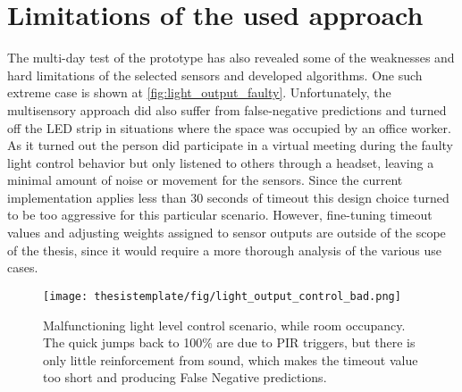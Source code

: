 
\section{Limitations of the used approach}

The multi-day test of the prototype has also revealed some of the weaknesses and hard limitations of the selected sensors and developed algorithms. One such extreme case is shown at \autoref{fig:light_output_faulty}. Unfortunately, the multisensory approach did also suffer from false-negative predictions and turned off the LED strip in situations where the space was occupied by an office worker. As it turned out the person did participate in a virtual meeting during the faulty light control behavior but only listened to others through a headset, leaving a minimal amount of noise or movement for the sensors. Since the current implementation applies less than 30 seconds of timeout this design choice turned to be too aggressive for this particular scenario. However, fine-tuning timeout values and adjusting weights assigned to sensor outputs are outside of the scope of the thesis, since it would require a more thorough analysis of the various use cases.




\begin{figure}[ht!]
  \begin{center}
    \texttt{[image: thesistemplate/fig/light\_output\_control\_bad.png]}
    \caption{Malfunctioning light level control scenario, while room occupancy. The quick jumps back to 100\% are due to PIR triggers, but there is only little reinforcement from sound, which makes the timeout value too short and producing False Negative predictions. }
    \label{fig:light_output_faulty}
  \end{center}
\end{figure}

